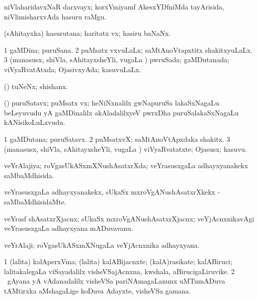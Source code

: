 \bentry
{} 
\gl{\nA}
\expl{}
\bmng
 niVlaharidavxNaR darxvayx; korxVmiyamf AkesxYDfniMda tayArisida, niVlimisharxvAda hasuru raMgu. 
\emng
\eentry

\bentry 
{} 
\gl{\nA}
\expl{}
\bmng
 (sAhitayxka) hasurutana; haritatx vx; hasiru baNaNx. 
\emng
\eentry

\bentry
{} 
\gl{\gu}
\expl{}
\bmng
\bnum
\num{1} gaMDina; puruSana. 
\num{2} puMsatx vxvuLaLx; saMtAnoVtapxtitx shakitxyuLaLx. 
\num{3} (manasusx, shiVla, sAhitayxsheYli, \mo vugaLa \vi) pwruSada; gaMDutanada; viVyaRvatAtxda; OjasivxyAda; kasuvuLaLx. 
\enum
\emng
\eentry

\bentry 
{}
\gl{\nA}
\expl{}
\bmng
 (\pArxparx) tuNeNx; shishanx. 
\emng
\eentry

\bentry
{} 
\gl{\nA}
\expl{}
\bmng
 (\veYshA) puruSatavx; puMsatx vx; heNiNxnalilx gwNapuruSa lakaSxNagaLu beLeyuvudu yA gaMDinalilx akAladalilxyeV pwrxDha puruSalakaSxNagaLu kANisikoLuLxvudu. 
\emng
\eentry

\bentry
{} 
\gl{\nA}
\expl{}
\bmng
\bnum
\num{1} gaMDutana; puruSatavx. 
\num{2} puMsatxvX; saMtAnoVtApxdaka shakitx. 
\num{3} (manasusx, shiVla, sAhitayxsheYli, \mo vugaLa \vi) viVyaRvatatxte; Ojasusx; kasuvu. 
\enum
\emng
\eentry

\bentry 
{} 
\gl{\gu}
\expl{}
\bmng
 veYrAlajiya; roVgasUkASxmXNushAsatxrXda; veYrasusxgaLa adhayxyanakekx saMbaMdhisida. 
\emng
\eentry

\bentry
{} 
\gl{\kirxvi}
\expl{}
\bmng
 veYrasusxgaLa adhayxyanakekx, sUkaSx mxroVgANushAsatxrXkekx -saMbaMdhisidaMte. 
\emng
\eentry

\bentry
{} 
\gl{\nA}
\expl{}
\bmng
 veYrasf shAsatxrXjacnx; sUkaSx mxroVgANushAsatxrXjacnx; veYjAcnxnikavAgi veYrasusxgaLa adhayxyana mADuvavanu. 
\emng
\eentry

\bentry
{} 
\gl{\nA}
\expl{}
\bmng
 veYrAlaji; roVgasUkASxmXNugaLa veYjAcnxnika adhayxyana. 
\emng
\eentry

\bentry
{} 
\gl{\nA}
\expl{}
\bmng
\bnum
\num{1} (lalita) kalAperxVma; (lalita) kalABijacnxte; (kalA)rasikate; kalABiruci; lalitakalegaLa viSayadalilx visheVSajAcnxna, kwshala, aBirucigaLiruvike. 
\hypertarget{virtu(2)}{} 
\num{2} \kanmu\ gAyana yA vAdanadalilx visheVSa pariNAmagaLanunx uMTumADuva tAMtirxka aMshagaLige koDuva Adayxte, visheVSa gamana. 
\enum
\emng

